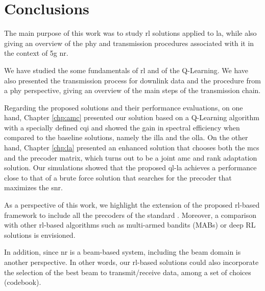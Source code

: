 \glsresetall
%

\chapter{Conclusions}%
\label{chp:conclusion}

The main purpose of this work was to study \gls{rl} solutions applied to \gls{la}, while also giving an overview of the \gls{phy} and transmission procedures associated with it in the context of \gls{5g} \gls{nr}.

We have studied the some fundamentals of \gls{rl} and of the Q-Learning.
%
We have also presented the transmission process for downlink data and the procedure from a \gls{phy} perspective, giving an overview of the main steps of the transmission chain.

Regarding the proposed solutions and their performance evaluations, on one hand, Chapter \ref{chp:amc} presented our solution based on a Q-Learning algorithm with a specially defined \gls{cqi} and showed the gain in spectral efficiency when compared to the baseline solutions, namely the \gls{illa} and the \gls{olla}.
%
On the other hand, Chapter \ref{chp:la} presented an enhanced solution that chooses both the \gls{mcs} and the precoder matrix, which turns out to be a joint \gls{amc} and rank adaptation solution.
%
Our simulations showed that the proposed \gls{ql-la} achieves a performance close to that of a brute force solution that searches for the precoder that maximizes the \gls{snr}.

As a perspective of this work, we highlight the extension of the proposed \gls{rl}-based framework to include all the precoders of the standard \cite{3gpp.38.214}.
%
Moreover, a comparison with other \gls{rl}-based algorithms such as multi-armed bandits (MABs) \cite{zhou2015survey} or deep RL solutions \cite{DeepRLSurvey} is envisioned.

In addition, since \gls{nr} is a beam-based system, including the beam domain is another perspective.
%
In other words, our \gls{rl}-based solutions could also incorporate the selection of the best beam to transmit/receive data, among a set of choices (codebook).
